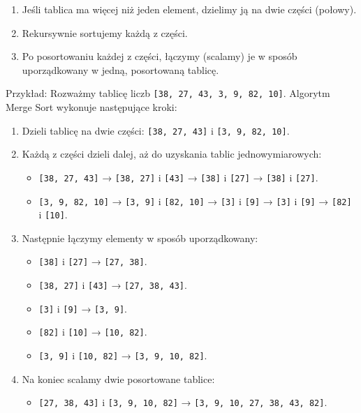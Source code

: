 \begin{enumerate}
  \item Jeśli tablica ma więcej niż jeden element, dzielimy ją na dwie części (połowy).
  \item Rekursywnie sortujemy każdą z części.
  \item Po posortowaniu każdej z części, łączymy (scalamy) je w sposób uporządkowany w jedną, posortowaną tablicę.
\end{enumerate}

Przykład: Rozważmy tablicę liczb \texttt{[38, 27, 43, 3, 9, 82, 10]}. Algorytm Merge Sort wykonuje następujące kroki:

\begin{enumerate}
  \item Dzieli tablicę na dwie części: \texttt{[38, 27, 43]} i \texttt{[3, 9, 82, 10]}.
  \item Każdą z części dzieli dalej, aż do uzyskania tablic jednowymiarowych:
        \begin{itemize}
          \item \texttt{[38, 27, 43]} → \texttt{[38, 27]} i \texttt{[43]} → \texttt{[38]} i \texttt{[27]} → \texttt{[38]} i \texttt{[27]}.
          \item \texttt{[3, 9, 82, 10]} → \texttt{[3, 9]} i \texttt{[82, 10]} → \texttt{[3]} i \texttt{[9]} → \texttt{[3]} i \texttt{[9]} → \texttt{[82]} i \texttt{[10]}.
        \end{itemize}
  \item Następnie łączymy elementy w sposób uporządkowany:
        \begin{itemize}
          \item \texttt{[38]} i \texttt{[27]} → \texttt{[27, 38]}.
          \item \texttt{[38, 27]} i \texttt{[43]} → \texttt{[27, 38, 43]}.
          \item \texttt{[3]} i \texttt{[9]} → \texttt{[3, 9]}.
          \item \texttt{[82]} i \texttt{[10]} → \texttt{[10, 82]}.
          \item \texttt{[3, 9]} i \texttt{[10, 82]} → \texttt{[3, 9, 10, 82]}.
        \end{itemize}
  \item Na koniec scalamy dwie posortowane tablice:
        \begin{itemize}
          \item \texttt{[27, 38, 43]} i \texttt{[3, 9, 10, 82]} → \texttt{[3, 9, 10, 27, 38, 43, 82]}.
        \end{itemize}
\end{enumerate}

